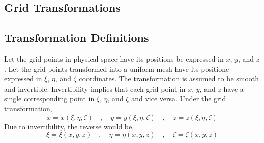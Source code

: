 \documentclass[a4paper, 12pt]{report}
\begin{document}
\begin{center}

\section{Grid Transformations}
\begin{comment}
\end{comment}

\subsection{Transformation Definitions}
\begin{comment}
\end{comment}
Let the grid points in physical space have its positions be expressed in $x$, $y$, and $z$. Let the grid points transformed into a uniform mesh have its positione expressed in $\xi$, $\eta$, and $\zeta$ coordinates. The transformation is assumed to be smooth and invertible. Invertibility implies that each grid point in $x$, $y$, and $z$ have a single corresponding point in $\xi$, $\eta$, and $\zeta$ and vice versa. Under the grid transformation, 
$$x = x(\xi,\eta,\zeta) \quad,\quad y = y(\xi,\eta,\zeta) \quad,\quad z = z(\xi,\eta,\zeta)$$
Due to invertibility, the reverse would be,
$$\xi = \xi(x,y,z) \quad,\quad \eta = \eta(x,y,z) \quad,\quad \zeta = \zeta(x,y,z)$$ 


\end{center}
\end{document}
